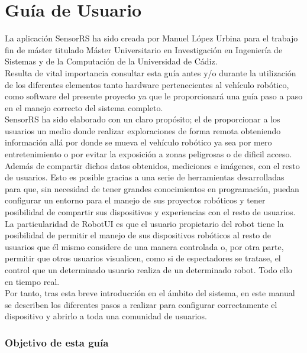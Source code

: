 \newpage

\chapter{ Guía de Usuario}
\label{chap:manual-usuario}

La aplicación SensorRS ha sido creada por Manuel López Urbina para el trabajo fin de máster titulado Máster Universitario en Investigación en Ingeniería de Sistemas y de la 
Computación de la Universidad de Cádiz.\\

Resulta de vital importancia consultar esta guía antes y/o durante la utilización de los diferentes elementos tanto hardware pertenecientes al vehículo robótico, como software del 
presente proyecto ya que le proporcionará una guía paso a paso en el manejo correcto del sistema completo.\\

SensorRS ha sido elaborado con un claro propósito; el de  proporcionar a los usuarios un medio donde realizar exploraciones de forma remota obteniendo información allá por donde se mueva el vehículo
robótico ya sea por mero entretenimiento o por evitar la exposición a zonas peligrosas o de dificil acceso. Además de compartir dichos datos obtenidos, mediciones e imágenes, con 
el resto de usuarios. Esto es posible gracias a una serie de herramientas desarrolladas para que, sin necesidad de tener grandes conocimientos en programación, puedan configurar un entorno para el manejo de sus proyectos robóticos y tener 
posibilidad de compartir sus dispositivos y experiencias con el resto de usuarios.\\

La particularidad de RobotUI es que el usuario propietario del robot tiene la posibilidad de permitir el manejo de sus dispositivos robóticos al resto de usuarios que él mismo considere de una 
manera controlada o, por otra parte, permitir que otros usuarios visualicen, como si de espectadores se tratase, el control que un determinado usuario realiza de un determinado robot.
Todo ello en tiempo real.\\

Por tanto, tras esta breve introducción en el ámbito del sistema, en este manual se describen los diferentes pasos a realizar para configurar correctamente el 
dispositivo y abrirlo a toda una comunidad de usuarios.\\

\subsection{Objetivo de esta guía}

